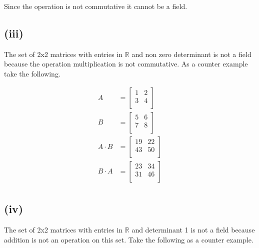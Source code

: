 \documentclass{article}
\begin{document}
      Since the operation is not commutative it cannot be a field.

    \subsection*{(iii)}
    The set of 2x2 matrices with entries in $\mathbb{R}$ and non zero determinant is not a field because the operation multiplication is not commutative. As a counter example take the following.

    \[
        \begin{split}
            A&=
           \left[ {\begin{array}{cc}
            1 & 2 \\
            3 & 4 \\
           \end{array} } \right]\\
           B&=
           \left[ {\begin{array}{cc}
            5 & 6 \\
            7 & 8 \\
           \end{array} } \right]\\
           A \cdot B &= 
           \left[ {\begin{array}{cc}
            19 & 22 \\
            43 & 50 \\
           \end{array} } \right]\\
           B \cdot A &= 
           \left[ {\begin{array}{cc}
            23 & 34 \\
            31 & 46 \\
           \end{array} } \right]\\
        \end{split}
      \]

    \subsection*{(iv)}
    The set of 2x2 matrices with entries in $\mathbb{R}$ and determinant 1 is not a field because addition is not an operation on this set. Take the following as a counter example. 
\end{document}
